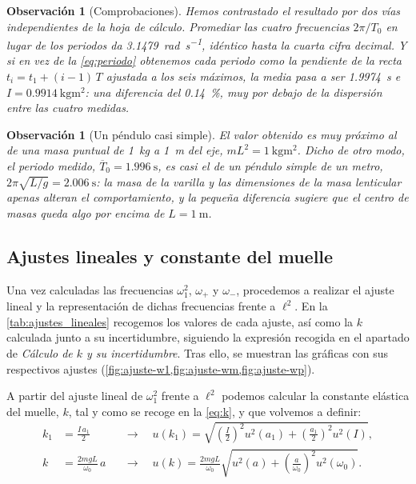 \documentclass[a4paper,11pt]{amsart}
\numberwithin{equation}{section}
\newcommand{\wz}{\omega_0}                    %
\newcommand{\wu}{\omega_1}                    %
\newcommand{\wm}{\omega_{-}}                  %
\newcommand{\wpl}{\omega_{+}}                 %
\newcommand{\mean}[1]{\overline{#1}}
\theoremstyle{cienplano}
\theoremstyle{ciendef}
\theoremstyle{cienobs}
\newtheorem{observacion}[proposicion]{Observación}
\begin{document}
\begin{observacion}[Comprobaciones]\label{obs:comprobaciones}
Hemos contrastado el resultado por dos vías independientes de la hoja de
cálculo. Promediar las cuatro frecuencias $2\pi/T_0$ en lugar de los
periodos da \SI{3,1479}{\radian\per\second}, idéntico hasta la cuarta cifra
decimal. Y si en vez de la \cref{eq:periodo} obtenemos cada periodo como la
pendiente de la recta $t_i=t_1+(i-1)\,T$ ajustada a los seis máximos, la media
pasa a ser \SI{1,9974}{\second} e $I=\SI{0,9914}{\kilogram\meter\squared}$: una
diferencia del \SI{0,14}{\percent}, muy por debajo de la dispersión entre las
cuatro medidas.
\end{observacion}

\begin{observacion}[Un péndulo casi simple]\label{obs:simple}
El valor obtenido es muy próximo al de una masa puntual de \SI{1}{\kilogram}
a \SI{1}{\meter} del eje, $mL^{2}=\SI{1}{\kilogram\meter\squared}$. Dicho de otro
modo, el periodo medido, $\mean{T}_0=\SI{1,996}{\second}$, es casi el de un
péndulo simple de un metro, $2\pi\sqrt{L/g}=\SI{2,006}{\second}$: la masa de la
varilla y las dimensiones de la masa lenticular apenas alteran el comportamiento, y
la pequeña diferencia sugiere que el centro de masas queda algo por encima
de $L=\SI{1}{\meter}$.
\end{observacion}

\subsection{Ajustes lineales y constante del muelle}\label{sec:ajustes}
Una vez calculadas las frecuencias $\wu^{2}$, $\wpl$ y $\wm$, procedemos a
realizar el ajuste lineal y la representación de dichas frecuencias frente a
$\ell^{2}$. En la \cref{tab:ajustes_lineales} recogemos los valores de cada
ajuste, así como la $k$ calculada junto a su incertidumbre, siguiendo la
expresión recogida en el apartado de \emph{Cálculo de $k$ y su
incertidumbre}. Tras ello, se muestran las gráficas con sus respectivos
ajustes (\cref{fig:ajuste-w1,fig:ajuste-wm,fig:ajuste-wp}).



\begin{destacado}
A partir del ajuste lineal de $\wu^{2}$ frente a $\ell^{2}$ podemos calcular
la constante elástica del muelle, $k$, tal y como se recoge en la
\cref{eq:k}, y que volvemos a definir:
\begin{align*}
  k_1&=\frac{I\,a_1}{2}
  &&\longrightarrow\quad
  u(k_1)=\sqrt{\left(\frac{I}{2}\right)^{\!2}u^{2}(a_1)+\left(\frac{a_1}{2}\right)^{\!2}u^{2}(I)},\\[0.4em]
  k&=\frac{2mgL}{\wz}\,a
  &&\longrightarrow\quad
  u(k)=\frac{2mgL}{\wz}\sqrt{u^{2}(a)+\left(\frac{a}{\wz}\right)^{\!2}u^{2}(\wz)} .
\end{align*}
\end{destacado}
\end{document}
